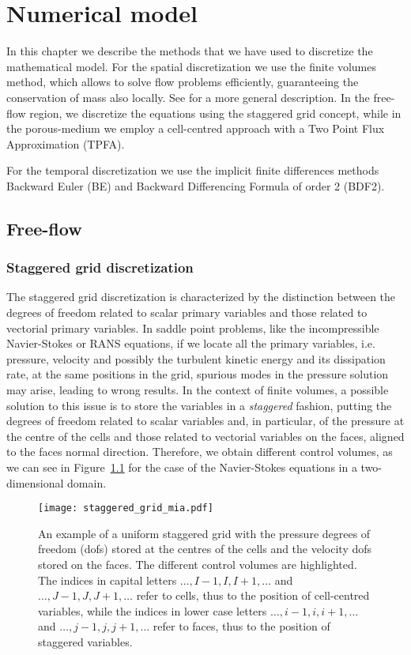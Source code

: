 \chapter{Numerical model} \label{chap:discretization} %
In this chapter we describe the methods that we have used to discretize the mathematical model. 
For the spatial discretization we use the finite volumes method, which allows 
to solve flow problems efficiently, guaranteeing the conservation of mass also locally. See 
\cite{fv:leveque} for a more general description.
In the free-flow region, we discretize the equations using the staggered grid 
concept, while in the porous-medium we employ a cell-centred approach with a 
Two Point Flux Approximation (TPFA).

For the temporal discretization we use the implicit finite differences methods 
Backward Euler (BE) and Backward Differencing Formula of order 2 (BDF2).
%
\section{Free-flow}
\subsection{Staggered grid discretization}
The staggered grid discretization is characterized by the distinction between 
the degrees of freedom related to scalar primary variables and those related to 
vectorial primary variables. In saddle point problems, like the incompressible 
Navier-Stokes or RANS equations, if we locate all the primary variables, i.e. 
pressure, velocity and possibly the turbulent kinetic energy and its 
dissipation rate, at the same positions in the grid, spurious modes in the 
pressure solution may arise, leading to wrong results. In the context of finite 
volumes, a possible solution to 
this issue 
is to store the variables in a \emph{staggered} fashion, putting 
the degrees of freedom related to scalar variables and, in particular, of the 
pressure at the centre of the cells 
and those related to vectorial variables on the faces, aligned to the faces 
normal direction. Therefore, we obtain different control volumes, as we can see 
in Figure~\ref{fig:staggrid} for the case of the 
Navier-Stokes equations in a two-dimensional domain.
\begin{figure}[t]
	\centering
	\texttt{[image: staggered\_grid\_mia.pdf]}
	\caption[Staggered grid control volumes]{An example of a uniform staggered 
	grid with the pressure degrees of freedom (dofs) stored at the centres of 
	the cells and the velocity dofs stored on the faces. The different control 
	volumes are highlighted. The indices in capital letters $\dots, I-1, I, 
	I+1, \dots$ and $\dots, J-1, J, J+1, \dots$ refer to cells, thus to the 
	position of cell-centred variables, while the indices in lower case letters 
	$\dots, i-1, i, i+1, \dots$ and $\dots,j-1,j,j+1,\dots$ refer to faces, 
	thus to the position of staggered variables.}
	\label{fig:staggrid}
\end{figure}

